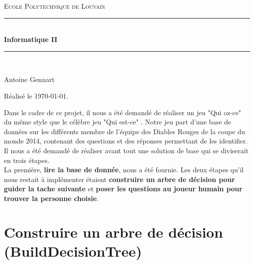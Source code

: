 \documentclass[12pt]{article}
\begin{document}
\begin{titlepage}

\newcommand{\HRule}{\rule{\linewidth}{0.5mm}}

\center 

\textsc{\LARGE Ecole Polytechnique de Louvain}\\[1cm]


\HRule \\[0.4cm]
{ \huge \bfseries Informatique II} 
\HRule \\[1cm]

\vspace{3cm}


\vspace{4cm}

\begin{minipage}{6cm}
\begin{center}
Antoine Gennart 
\end{center}
\end{minipage}
\begin{center}
Réalisé le \today.
\end{center}

\end{titlepage}

Dans le cadre de ce projet, il nous a été demandé de réaliser un jeu "Qui oz-ce" du même style que le célèbre jeu "Qui est-ce" . Notre jeu part d'une base de données sur les différents membre de l'équipe des Diables Rouges de la coupe du monde 2014, contenant des questions et des réponses permettant de les identifier. \\

Il nous a été demandé de réaliser avant tout une solution de base qui se diviserait en trois étapes.\\La première, \textbf{lire la base de donnée}, nous a été fournie. Les deux étapes qu'il nous restait à implémenter étaient \textbf{construire un arbre de décision pour guider la tache suivante} et \textbf{poser les questions au joueur humain pour trouver la personne choisie}.\\


\section{Construire un arbre de décision (BuildDecisionTree)}
\end{document}
